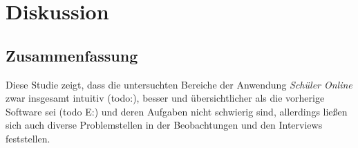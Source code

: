 \section{Diskussion}
\subsection{Zusammenfassung}
Diese Studie zeigt, dass die untersuchten Bereiche der Anwendung \textit{Schüler Online} zwar insgesamt intuitiv (todo:), besser und übersichtlicher als die vorherige Software sei (todo E:) und deren Aufgaben nicht schwierig sind, allerdings ließen sich auch diverse Problemstellen in der Beobachtungen und den Interviews feststellen. 

%



